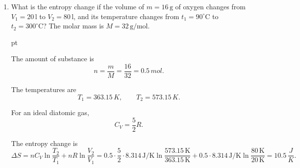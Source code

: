 \documentclass[a4paper,12pt]{letter}
\begin{document}
\begin{enumerate}
What is the efficiency of the cycle if $p_{3} = 5 p_{2}$, the compression ratio is 6, and the cycle is performed with a two-atomic gas? What is the efficiency of the Carnot cycle taking place between the same temperature limits?

\bigskip

The processes $1\to 2$ and $3\to 4$ are isothermal. The processes $2\to 3$ and $4\to 1$ are isochoric. Since $V_2=V_3$,
$$\frac{T_H}{T_C}=\frac{p_3}{p_2}=5.$$

The compression ratio is
$$r=\frac{V_1}{V_2}=6.$$

For a diatomic gas,
$$C_V=\frac{5}{2}R.$$

The absorbed heat is
$$Q_{in}=nC_V(T_H-T_C)+nRT_H\ln r.$$

Using $T_H=5T_C$,
$$Q_{in}=nR T_C\left(\frac{5}{2}\cdot 4+5\ln 6\right)=nR T_C(10+5\ln 6).$$

The work during the whole cycle is the difference of the two isothermal works:
$$W=nR(T_H-T_C)\ln r=4nRT_C\ln 6.$$

Thus,
$$\eta=\frac{W}{Q_{in}}=\frac{4\ln 6}{10+5\ln 6}=0.378=\boxed{37.8\%.}$$

The Carnot efficiency between the same temperature limits is
$$\eta_C=1-\frac{T_C}{T_H}=1-\frac{1}{5}=0.800=\boxed{80.0\%.}$$


\item What is the entropy change if the volume of $m = 16\,\mathrm{g}$ of oxygen changes from $V_1 = 20\,\mathrm{l}$ to $V_2 = 80\,\mathrm{l}$, and its temperature changes from $t_1 = 90^\circ\mathrm{C}$ to $t_2 = 300^\circ\mathrm{C}$? The molar mass is $M = 32\,\mathrm{g/mol}$.

\medskip

\begin{center}
\end{center}

 pt

The amount of substance is
$$n=\frac{m}{M}=\frac{16}{32}=0.5\,mol.$$

The temperatures are
$$T_1=363.15\,K,\qquad T_2=573.15\,K.$$

For an ideal diatomic gas,
$$C_V=\frac{5}{2}R.$$

The entropy change is
$$\Delta S=nC_V\ln\frac{T_2}{T_1}+nR\ln\frac{V_2}{V_1}=0.5\cdot \frac{5}{2}\cdot 8.314\,\mathrm{J/K}\ln\frac{573.15\,\mathrm{K}}{363.15\,\mathrm{K}}+0.5\cdot 8.314\,\mathrm{J/K}\ln\frac{80\,\mathrm{K}}{20\,\mathrm{K}}=\boxed{10.5\,\frac{J}{K}.}$$

\end{enumerate}

\bigskip


\vfill
\end{document}
